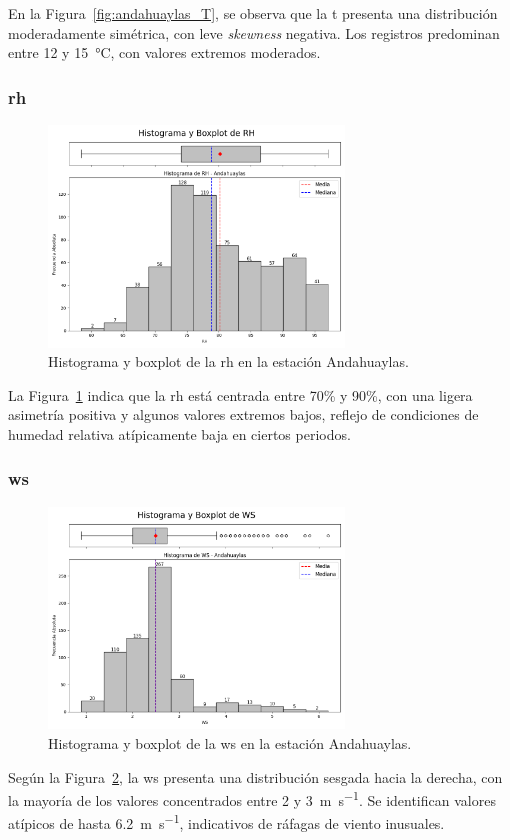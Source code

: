 En la Figura~\ref{fig:andahuaylas_T}, se observa que la \gls{t} presenta una distribución moderadamente simétrica, con leve \textit{skewness} negativa. Los registros predominan entre 12 y 15~\si{\degreeCelsius}, con valores extremos moderados.

\subsubsection*{\gls{rh} }
\begin{figure}[htbp]
\centering
\includegraphics[width=0.7\textwidth]{resultados/por_estacion_meteorologica/Andahuaylas/RH_histograma.png}
\caption{Histograma y boxplot de la \gls{rh}  en la estación Andahuaylas.}
\label{fig:andahuaylas_RH}
\end{figure}
La Figura~\ref{fig:andahuaylas_RH} indica que la \gls{rh} está centrada entre 70\% y 90\%, con una ligera asimetría positiva y algunos valores extremos bajos, reflejo de condiciones de humedad relativa atípicamente baja en ciertos periodos.

\subsubsection*{\gls{ws} }
\begin{figure}[htbp]
\centering
\includegraphics[width=0.7\textwidth]{resultados/por_estacion_meteorologica/Andahuaylas/WS_histograma.png}
\caption{Histograma y boxplot de la \gls{ws}  en la estación Andahuaylas.}
\label{fig:andahuaylas_WS}
\end{figure}
Según la Figura~\ref{fig:andahuaylas_WS}, la \gls{ws} presenta una distribución sesgada hacia la derecha, con la mayoría de los valores concentrados entre 2 y 3~\si{\meter\per\second}. Se identifican valores atípicos de hasta 6.2~\si{\meter\per\second}, indicativos de ráfagas de viento inusuales.

